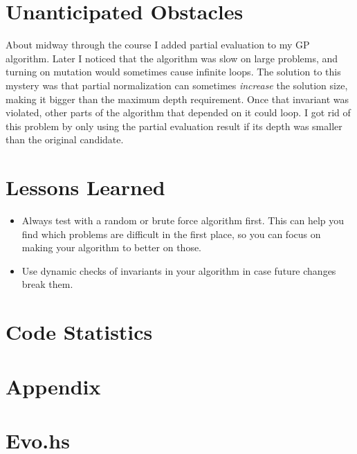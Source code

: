 \documentclass{article}
\begin{document}
\section{Unanticipated Obstacles}

About midway through the course I added partial evaluation to my GP
algorithm. Later I noticed that the algorithm was slow on large
problems, and turning on mutation would sometimes cause infinite
loops. The solution to this mystery was that partial normalization can
sometimes \textit{increase} the solution size, making it bigger than
the maximum depth requirement. Once that invariant was violated, other
parts of the algorithm that depended on it could loop. I got rid of
this problem by only using the partial evaluation result if its depth
was smaller than the original candidate.

\section{Lessons Learned}

\begin{itemize}
\item Always test with a random or brute force algorithm first. This can
help you find which problems are difficult in the first place, so you
can focus on making your algorithm to better on those.
\item Use dynamic checks of invariants in your algorithm in case future
changes break them.
\end{itemize}

\section{Code Statistics}

\section*{Appendix}
\appendix

\section{Evo.hs}
\end{document}
